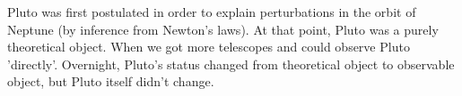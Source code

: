 Pluto was first postulated in order to explain perturbations in the orbit of Neptune (by inference from Newton's laws). At that point, Pluto was a purely theoretical object. When we got more telescopes and could observe Pluto 'directly'. Overnight, Pluto's status changed from theoretical object to observable object, but Pluto itself didn't change.